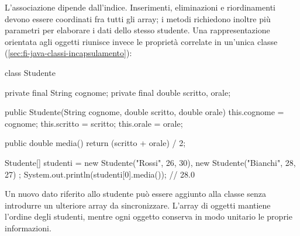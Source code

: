 \clearpage

L'associazione dipende dall'indice. Inserimenti, eliminazioni
e riordinamenti devono essere coordinati fra tutti gli array;
i metodi richiedono inoltre più parametri per elaborare i
dati dello stesso studente. Una rappresentazione orientata
agli oggetti riunisce invece le proprietà correlate in
un'unica classe (\cref{sec:fi-java-classi-incapsulamento}):

\begin{unipdcode}[language=Java]
class Studente {
    private final String cognome;
    private final double scritto, orale;

    public Studente(String cognome, double scritto, double orale) {
        this.cognome = cognome;
        this.scritto = scritto;
        this.orale = orale;
    }

    public double media() { return (scritto + orale) / 2; }
}
\end{unipdcode}

\begin{unipdcode}[language=Java]
Studente[] studenti = {
    new Studente("Rossi", 26, 30),
    new Studente("Bianchi", 28, 27)
};
System.out.println(studenti[0].media());  // 28.0
\end{unipdcode}

Un nuovo dato riferito allo studente può essere aggiunto alla
classe senza introdurre un ulteriore array da sincronizzare.
L'array di oggetti mantiene l'ordine degli studenti, mentre
ogni oggetto conserva in modo unitario le proprie informazioni.
